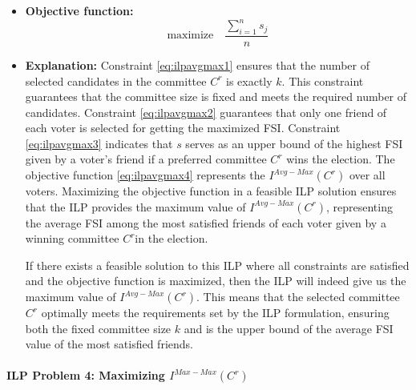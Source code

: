 \documentclass{article}
\begin{document}
\begin{itemize}
  \item  \textbf{Objective function:}
  \begin{equation}\text{maximize} \quad \frac{\sum_{i=1}^{n} s_j}{n}    \label{eq:ilpavgmax4}
\end{equation}


\item  \textbf{Explanation:}
Constraint \ref{eq:ilpavgmax1} ensures that the number of selected candidates in the committee \(C^r\) is exactly \(k\). This constraint guarantees that the committee size is fixed and meets the required number of candidates.
Constraint \ref{eq:ilpavgmax2} guarantees that only one friend of each voter is selected for getting the maximized FSI.
Constraint \ref{eq:ilpavgmax3} indicates that \(s\) serves as an upper bound of the highest FSI given by a voter's friend if a preferred committee \(C^r\) wins the election.
The objective function \ref{eq:ilpavgmax4} represents the $I^{Avg-Max}(C^{r})$ over all voters. Maximizing the objective function in a feasible ILP solution ensures that the ILP provides the maximum value of \(I^{Avg-Max}(C^{r})\), representing the average FSI among the most satisfied friends of each voter given by a winning committee \(C^r\)in the election. 

If there exists a feasible solution to this ILP where all constraints are satisfied and the objective function is maximized, then the ILP will indeed give us the maximum value of \(I^{Avg-Max}(C^{r})\). This means that the selected committee \(C^r\) optimally meets the requirements set by the ILP formulation, ensuring both the fixed committee size \(k\) and is the upper bound of the average FSI value of the most satisfied friends. 

\end{itemize}


\paragraph*{ILP Problem 4: Maximizing  $I^{Max-Max}(C^{r})$}\mbox{} \\
\end{document}
